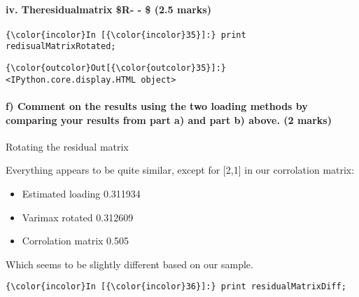 \documentclass[11pt]{article}
\providecommand{\tightlist}{%
      \setlength{\itemsep}{0pt}\setlength{\parskip}{0pt}}
\begin{document}
    \hypertarget{iv.-theresidualmatrix-r----2.5-marks}{%
\paragraph{\texorpdfstring{iv. Theresidualmatrix \$R-
 -\hat { \psi  } \$ (2.5
marks)}{iv. Theresidualmatrix \$R-  - \$ (2.5 marks)}}\label{iv.-theresidualmatrix-r----2.5-marks}}

    \begin{Verbatim}[commandchars=\\\{\}]
{\color{incolor}In [{\color{incolor}35}]:} print redisualMatrixRotated;
\end{Verbatim}


\begin{Verbatim}[commandchars=\\\{\}]
{\color{outcolor}Out[{\color{outcolor}35}]:} <IPython.core.display.HTML object>
\end{Verbatim}
            
    \hypertarget{f-comment-on-the-results-using-the-two-loading-methods-by-comparing-your-results-from-part-a-and-part-b-above.-2-marks}{%
\paragraph{f) Comment on the results using the two loading methods by
comparing your results from part a) and part b) above. (2
marks)}\label{f-comment-on-the-results-using-the-two-loading-methods-by-comparing-your-results-from-part-a-and-part-b-above.-2-marks}}

    Rotating the residual matrix

Everything appears to be quite similar, except for {[}2,1{]} in our
corrolation matrix:

\begin{itemize}
\tightlist
\item
  Estimated loading 0.311934
\item
  Varimax rotated 0.312609
\item
  Corrolation matrix 0.505
\end{itemize}

Which seems to be slightly different based on our sample.

    \begin{Verbatim}[commandchars=\\\{\}]
{\color{incolor}In [{\color{incolor}36}]:} print residualMatrixDiff;
\end{Verbatim}
\end{document}
